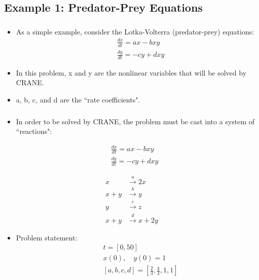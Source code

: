 \subsection{Example 1: Predator-Prey Equations}
\begin{frame}[fragile]
	\frametitle{\insertsubsectionhead}
	\begin{itemize}
		\item As a simple example, consider the Lotka-Volterra (predator-prey) equations:
		\begin{align*}
			&\frac{dx}{dt} = ax - bxy \\
			&\frac{dy}{dt} = -cy + dxy
		\end{align*}
		\item In this problem, x and y are the nonlinear variables that will be solved by CRANE.
		\item a, b, c, and d are the ``rate coefficients".
	\end{itemize}
\end{frame}

\begin{frame}[fragile]
	\frametitle{\insertsubsectionhead}
	\begin{itemize}
		\item In order to be solved by CRANE, the problem must be cast into a system of ``reactions": 
	\end{itemize}
	\begin{minipage}{0.5\linewidth}
		\begin{align*}
			&\frac{dx}{dt} = ax - bxy \\
			&\frac{dy}{dt} = -cy + dxy
		\end{align*}
	\end{minipage}%
	\begin{minipage}{0.5\linewidth}
		\begin{align*}
			x &\xrightarrow{a} 2x \\
			x + y &\xrightarrow{b} y \\
			y &\xrightarrow{c} z \\
			x + y &\xrightarrow{d} x + 2y
		\end{align*}
	\end{minipage}
	\begin{itemize}
		\item Problem statement:
		\begin{align*}
			&t = [0,50] \\
			&x(0), \quad y(0) = 1 \\
			&[a,b,c,d] = [\tfrac{2}{3},\tfrac{4}{3},1,1]
		\end{align*}
	\end{itemize}
\end{frame}

